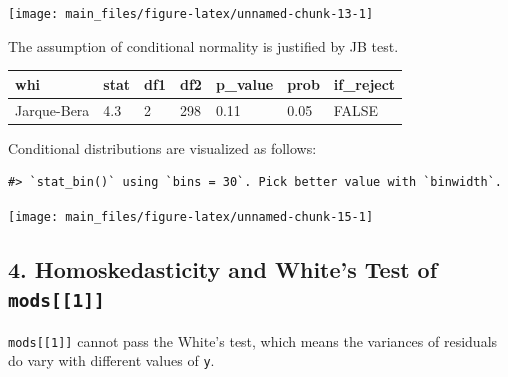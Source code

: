 \documentclass[a4paper]{article}
\newenvironment{Shaded}{\begin{snugshade}}{\end{snugshade}}
\newcommand{\DecValTok}[1]{\textcolor[rgb]{0.00,0.00,0.81}{#1}}
\newcommand{\KeywordTok}[1]{\textcolor[rgb]{0.13,0.29,0.53}{\textbf{#1}}}
\newcommand{\NormalTok}[1]{#1}
\newcommand{\OperatorTok}[1]{\textcolor[rgb]{0.81,0.36,0.00}{\textbf{#1}}}
\newcommand{\StringTok}[1]{\textcolor[rgb]{0.31,0.60,0.02}{#1}}
\begin{document}
\begin{center}\texttt{[image: main\_files/figure-latex/unnamed-chunk-13-1]} \end{center}

The assumption of conditional normality is justified by JB test.

\begin{table}[H]
\centering
\begin{tabular}{lllllll}
\toprule
whi & stat & df1 & df2 & p\_value & prob & if\_reject\\
\midrule
Jarque-Bera & 4.3 & 2 & 298 & 0.11 & 0.05 & FALSE\\
\bottomrule
\end{tabular}
\end{table}

Conditional distributions are visualized as follows:

\begin{verbatim}
#> `stat_bin()` using `bins = 30`. Pick better value with `binwidth`.
\end{verbatim}

\begin{center}\texttt{[image: main\_files/figure-latex/unnamed-chunk-15-1]} \end{center}

\hypertarget{homoskedasticity-and-whites-test-of-mods1}{%
\subsection{\texorpdfstring{4. Homoskedasticity and White's Test of
\texttt{mods{[}{[}1{]}{]}}}{4. Homoskedasticity and White's Test of mods{[}{[}1{]}{]}}}\label{homoskedasticity-and-whites-test-of-mods1}}

\texttt{mods{[}{[}1{]}{]}} cannot pass the White's test, which means the
variances of residuals do vary with different values of \texttt{y}.

\begin{Shaded}
\end{Shaded}
\end{document}
